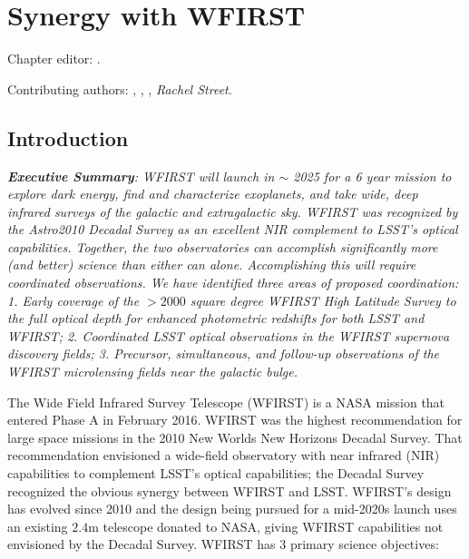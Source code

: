 \chapter[Synergy with WFIRST]{Synergy with WFIRST}
\def\chpname{wfirst}\label{chp:\chpname}

Chapter editor:
.

Contributing authors:
,
,
,
{\it Rachel Street}.


\section{Introduction}
\label{sec:wfirst:intro}


\emph{\textbf{Executive Summary}:
WFIRST will launch in $\sim$ 2025 for a 6 year mission to explore dark energy, find and characterize exoplanets, and take wide, deep infrared surveys of the galactic and extragalactic sky.  WFIRST was recognized by the Astro2010 Decadal Survey as an excellent NIR complement to LSST's optical capabilities.  Together, the two observatories can accomplish significantly more (and better) science than either can alone. Accomplishing this will require coordinated observations.  We have identified three areas of proposed coordination: 1. Early coverage of the $>2000$ square degree WFIRST High Latitude Survey to the full optical depth for enhanced photometric redshifts for both LSST and WFIRST; 2. Coordinated LSST optical observations in the WFIRST supernova discovery fields; 3. Precursor, simultaneous, and follow-up observations of the WFIRST microlensing fields near the galactic bulge. }




The Wide Field Infrared Survey Telescope (WFIRST) is a NASA mission that
entered Phase A in February 2016.  WFIRST was the highest recommendation
for large space missions in the 2010 New Worlds New Horizons Decadal
Survey.  That recommendation envisioned a wide-field observatory with
near infrared (NIR) capabilities to complement LSST's optical
capabilities; the Decadal Survey recognized the obvious synergy between
WFIRST and LSST.  WFIRST's design has evolved since 2010 and the design
being pursued for a mid-2020s launch uses an existing $2.4$m telescope
donated to NASA, giving WFIRST capabilities not envisioned by the
Decadal Survey.  WFIRST has 3 primary science objectives:

